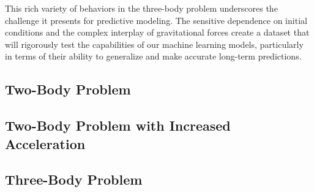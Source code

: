 \documentclass[12pt,a4paper]{article}
\begin{document}
This rich variety of behaviors in the three-body problem underscores the challenge it presents for predictive modeling. The sensitive dependence on initial conditions and the complex interplay of gravitational forces create a dataset that will rigorously test the capabilities of our machine learning models, particularly in terms of their ability to generalize and make accurate long-term predictions.

\subsection{Two-Body Problem}

\subsection{Two-Body Problem with Increased Acceleration}

\subsection{Three-Body Problem}
\end{document}
